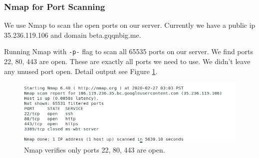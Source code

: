 \documentclass[12pt, a4paper]{article}
\newcommand{\code}[1]{\texttt{#1}}
\begin{document}
\subsubsection{Nmap for Port Scanning}
We use Nmap to scan the open ports on our server. Currently we have a public ip 35.236.119.106 and domain beta.gqqnbig.me.

Running Nmap with \code{-p-} flag to scan all 65535 ports on our server.
We find ports 22, 80, 443 are open. These are exactly all ports we need to use. We didn't leave any unused port open. Detail output see Figure \ref{fig:nmap}.

\begin{figure}[ht]
\centering
\includegraphics[width=\textwidth, frame]{nmap_log.png}
\caption{Nmap verifies only ports 22, 80, 443 are open.}
\label{fig:nmap}
\end{figure}

\end{document}
